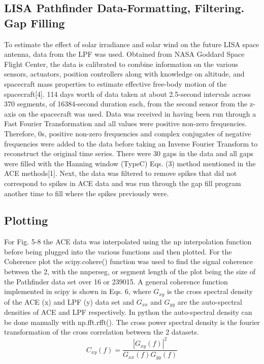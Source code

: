 \documentclass[%
 reprint,
 amsmath,amssymb,
 aps,
]{revtex4-2}
\begin{document}
\subsection{LISA Pathfinder Data-Formatting, Filtering. Gap Filling}
To estimate the effect of solar irradiance and solar wind on the future LISA space antenna, data from the LPF was used. Obtained from NASA Goddard Space Flight Center, the data is calibrated to combine information on the various sensors, actuators, position controllers along with knowledge on altitude, and spacecraft mass properties to estimate effective free-body motion of the spacecraft[4]. 114 days worth of data taken at about 2.5-second intervals across 370 segments, of 16384-second duration each, from the second sensor from the z-axis on the spacecraft was used. Data was received in having been run through a Fast Fourier Transformation and all values were positive non-zero frequencies. Therefore, 0s, positive non-zero frequencies and complex conjugates of negative frequencies were added to the data before taking an Inverse Fourier Transform to reconstruct the original time series. There were 30 gaps in the data and all gaps were filled with the Hanning window (TypeC) Eqs. (3) method mentioned in the ACE methods[1]. Next, the data was filtered to remove spikes that did not correspond to spikes in ACE data and was run through the gap fill program another time to fill where the spikes previously were.

\subsection{Plotting}


For Fig. 5-8 the ACE data was interpolated using the np interpolation function before being plugged into the various functions and then plotted. For the Coherence plot the scipy.cohere() function was used to find the signal coherence between the 2, with the nnperseg, or segment length of the plot being the size of the Pathfinder data set over 16 or 239015. A general coherence function implemented in scipy is shown in Eqs. 6, where \(G_{{xy}}\) is the cross spectral density of the ACE (x) and LPF (y) data set and \(G_{{xx}}\) and \(G_{{yy}}\) are the auto-spectral densities of ACE and LPF respectively. In python the auto-spectral density can be done manually with np.fft.rfft(). The cross power spectral density is the fourier transformation of the cross correlation between the 2 datasets. 
\begin{equation}\label{eq:Coherence function function}
C_{{xy}}(f)={\frac {|G_{{xy}}(f)|^{2}}{G_{{xx}}(f)G_{{yy}}(f)}}
\end{equation}
\end{document}
